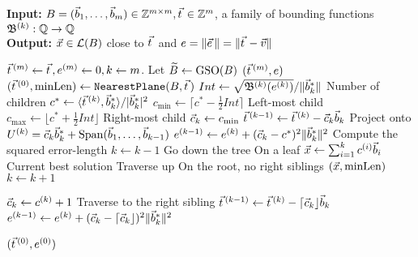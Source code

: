 \begin{algorithm}[t]
\caption{$\GenPrunDepth (\BMat, \protect \tvec, \B^{(k)})$}
\label{alg:GenPrunDepth}
\textbf{Input:} $\BMat=(\bvec_1, \ldots, \bvec_m) \in \Z^{m \times m}, \tvec \in \Z^m$, a family of bounding functions $\mathfrak{B}^{(k)}: \mathbb{Q} \rightarrow \mathbb{Q}$ \\
\textbf{Output:} $\vec x\in \mathcal{L}(B)$ close to $\tvec$ and $e = \|\evec\| = \| \tvec - \vvec \| $
\begin{algorithmic}[1]
\State $\tvec^{(m)}\gets \tvec, e^{(m)} \gets 0, k \gets m $.
\State Let $\widetilde{B}\gets\operatorname{GSO}(B)$
 \Return $(\tvec^{(m)}, e)$
\EndIf
\State $(\tvec^{(0)}, \text{minLen}) \gets \NP (\BMat, \tvec)$
		\State $Int \gets \sqrt{ \mathfrak{B}^{(k)}(e^{(k)}) } / \| \vec b^*_k \|$  \Comment Number of children \label{algline:GenPrunDNumChildren}
		\State $c^{*} \gets \langle \tvec^{(k)}, \wbvec_k  \rangle / \normalabs{\wbvec_{k}}^2 $
		\State $c_{\text{min}} \gets \lceil c^{*} - \tfrac{1}{2} Int \rceil$ \Comment Left-most child
		\State $c_{\text{max}} \gets \lfloor c^{*} + \tfrac{1}{2} Int \rfloor$ \Comment Right-most child
		\State $\cvec_k \gets c_{\text{min}}$
		\State $\tvec^{(k-1)} \gets \tvec^{(k)} - \cvec_k \bvec_k $	 \Comment Project onto $U^{(k)} = \cvec_k \wbvec_{k}+ \Span(\bvec_1, \ldots, \bvec_{k-1})$
		\State $e^{(k-1)} \gets e^{(k)} + (\cvec_k - c^{*})^2 \|\wbvec_{k}\|^2$ \Comment Compute the squared error-length
		\State $k \gets k-1$ \Comment Go down the tree
	\Else \Comment On a leaf
			\State $\vec x \gets \sum_{i=1}^k c^{(i)} \vec b_i$ \Comment Current best solution \label{algline:GenPrunDSol}
		\EndIf
		\Repeat \Comment Traverse up
			 \Comment On the root, no right siblings
				\State \Return $(\vec x, \text{minLen})$
			\EndIf
			\State $k \gets k+1$

		\State $\cvec_k \gets c^{(k)} + 1$ \Comment Traverse to the right sibling
		\State $\tvec^{(k-1)} \gets \tvec^{(k)} - \lceil \cvec_k \rfloor \bvec_k $
		\State $e^{(k-1)} \gets e^{(k)} + (\cvec_k - \lceil \cvec_k \rfloor)^2 \|\wbvec_{k}\|^2$

	\EndIf
\EndWhile

\State \Return $(\tvec^{(0)}, e^{(0)})$

\end{algorithmic}
\end{algorithm}

